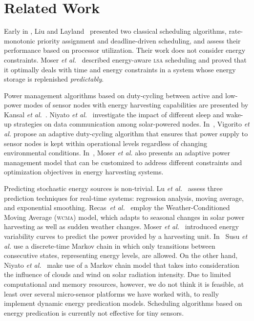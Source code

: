 \section{Related Work} \label{sec:related work}
Early in , Liu and Layland~\cite{Liu73} presented two classical scheduling algorithms, rate-monotonic priority assignment and deadline-driven scheduling, 
and assess their performance based on processor utilization. Their work does not consider energy constraints. Moser \emph{et al.}~\cite{moser2007real} described energy-aware \textsc{lsa} scheduling
and proved that it optimally deals with time and energy constraints in a system whose energy storage is replenished \textit{predictably}. 

Power management algorithms based on duty-cycling between active and low-power modes of sensor nodes with energy harvesting capabilities are 
presented by Kansal \emph{et al.}~\cite{kansal2007power}. Niyato \emph{et al.}~\cite{niyato2007sleep} investigate the impact of different sleep and wake-up strategies on data communication
among solar-powered nodes. In~\cite{vigorito2007adaptive}, Vigorito \emph{et al.} propose an adaptive duty-cycling algorithm that ensures that power supply to sensor
nodes is kept within operational levels regardless of changing environmental conditions. In~\cite{moser2007adaptive}, Moser \emph{et al.} also presents an adaptive power management
model that can be customized to address different constraints and optimization objectives in energy harvesting systems.

Predicting stochastic energy sources is non-trivial.  Lu \emph{et al.}~\cite{lu2010accurate} assess three prediction techniques for real-time systems: regression analysis,
moving average, and exponential smoothing. Recas~\emph{et al.}~\cite{recas2000hollows} employ the Weather-Conditioned Moving Average (\textsc{wcma}) model, which adapts to seasonal changes in
solar power harvesting as well as sudden weather changes. Moser \emph{et al.}~\cite{moser2007real} introduced energy variability curves to predict the power provided by a harvesting unit. In~\cite{susu2008stochastic} Susu \emph{et al.} use a discrete-time Markov chain in which only transitions between 
consecutive states, representing energy levels, are allowed. On the other hand, Niyato \emph{et al.}~\cite{niyato2007sleep} make use of a Markov chain model  that takes into consideration the influence of clouds and wind on solar radiation intensity. Due to limited computational and memory resources, however, we do not think it is feasible, at least over several micro-sensor platforms we have worked with, to really implement dynamic energy predication models. Scheduling algorithms based on energy predication is currently not effective for tiny sensors.  

